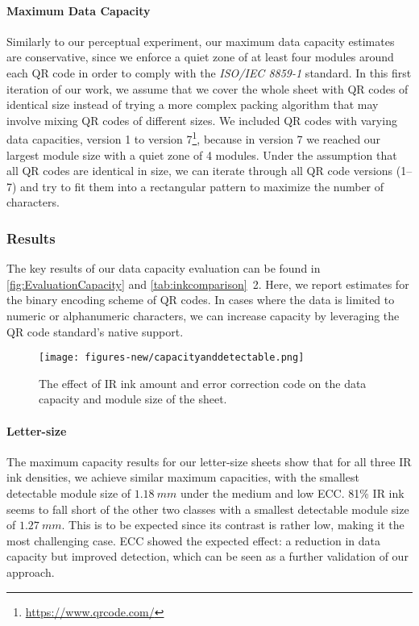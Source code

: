 \paragraph{Maximum Data Capacity}
Similarly to our perceptual experiment, our maximum data capacity estimates are conservative, since we enforce a quiet zone of at least four modules around each QR code in order to comply with the \textit{ISO/IEC 8859-1} standard. In this first iteration of our work, we assume that we cover the whole sheet with QR codes of identical size instead of trying a more complex packing algorithm that may involve mixing QR codes of different sizes. 
We included QR codes with varying data capacities, version 1 to version 7\footnote{\url{https://www.qrcode.com/}}, because in version 7 we reached our largest module size with a quiet zone of 4 modules.
Under the assumption that all QR codes are identical in size, we can iterate through all QR code versions (1--7) and try to fit them into a rectangular pattern to maximize the number of characters.



\subsubsection{Results}

The key results of our data capacity evaluation can be found in \autoref{fig:EvaluationCapacity} and \autoref{tab:inkcomparison}~2.
Here, we report estimates for the binary encoding scheme of QR codes. In cases where the data is limited to numeric or alphanumeric characters, we can increase capacity by leveraging the QR code standard's native support.

\begin{figure*}[]
      \centering
      \texttt{[image: figures-new/capacityanddetectable.png]}
      \caption{The effect of  IR ink amount and error correction code on the data capacity and module size of the sheet.}
      \label{fig:EvaluationCapacity}
  \end{figure*}

\vspace{-0.1cm}
   
\paragraph{Letter-size}
The maximum capacity results for our letter-size sheets show that for all three IR ink densities, we achieve similar maximum capacities, with the smallest detectable module size of $1.18~mm$ under the medium and low ECC. 81\% IR ink seems to fall short of the other two classes with a smallest detectable module size of $1.27~mm$. This is to be expected since its contrast is rather low, making it the most challenging case. ECC showed the expected effect: a reduction in data capacity but improved detection, which can be seen as a further validation of our approach.  

